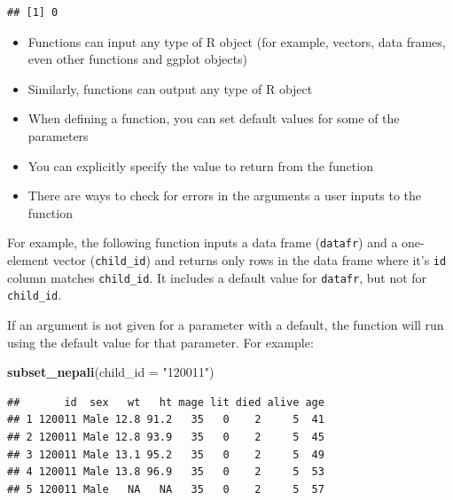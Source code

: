 \documentclass[]{book}
\makeatletter
\newenvironment{Shaded}{\begin{snugshade}}{\end{snugshade}}
\newcommand{\KeywordTok}[1]{\textcolor[rgb]{0.13,0.29,0.53}{\textbf{{#1}}}}
\newcommand{\DataTypeTok}[1]{\textcolor[rgb]{0.13,0.29,0.53}{{#1}}}
\newcommand{\StringTok}[1]{\textcolor[rgb]{0.31,0.60,0.02}{{#1}}}
\newcommand{\NormalTok}[1]{{#1}}
\providecommand{\tightlist}{%
  \setlength{\itemsep}{0pt}\setlength{\parskip}{0pt}}
\newenvironment{kframe}{%
\medskip{}
\setlength{\fboxsep}{.8em}
 \def\at@end@of@kframe{}%
 \ifinner\ifhmode%
  \def\at@end@of@kframe{\end{minipage}}%
  \begin{minipage}{\columnwidth}%
 \fi\fi%
 \def\FrameCommand##1{\hskip\@totalleftmargin \hskip-\fboxsep
 \colorbox{shadecolor}{##1}\hskip-\fboxsep
     \hskip-\linewidth \hskip-\@totalleftmargin \hskip\columnwidth}%
 \MakeFramed {\advance\hsize-\width
   \@totalleftmargin\z@ \linewidth\hsize
   \@setminipage}}%
 {\par\unskip\endMakeFramed%
 \at@end@of@kframe}
\renewenvironment{Shaded}{\begin{kframe}}{\end{kframe}}
\makeatother
\begin{document}
\begin{verbatim}
## [1] 0
\end{verbatim}

\begin{itemize}
\tightlist
\item
  Functions can input any type of R object (for example, vectors, data
  frames, even other functions and ggplot objects)
\item
  Similarly, functions can output any type of R object
\item
  When defining a function, you can set default values for some of the
  parameters
\item
  You can explicitly specify the value to return from the function
\item
  There are ways to check for errors in the arguments a user inputs to
  the function
\end{itemize}

For example, the following function inputs a data frame
(\texttt{datafr}) and a one-element vector (\texttt{child\_id}) and
returns only rows in the data frame where it's \texttt{id} column
matches \texttt{child\_id}. It includes a default value for
\texttt{datafr}, but not for \texttt{child\_id}.

\begin{Shaded}
\end{Shaded}

If an argument is not given for a parameter with a default, the function
will run using the default value for that parameter. For example:

\begin{Shaded}
\begin{Highlighting}[]
\KeywordTok{subset_nepali}\NormalTok{(}\DataTypeTok{child_id =} \StringTok{"120011"}\NormalTok{)}
\end{Highlighting}
\end{Shaded}

\begin{verbatim}
##       id  sex   wt   ht mage lit died alive age
## 1 120011 Male 12.8 91.2   35   0    2     5  41
## 2 120011 Male 12.8 93.9   35   0    2     5  45
## 3 120011 Male 13.1 95.2   35   0    2     5  49
## 4 120011 Male 13.8 96.9   35   0    2     5  53
## 5 120011 Male   NA   NA   35   0    2     5  57
\end{verbatim}
\end{document}
